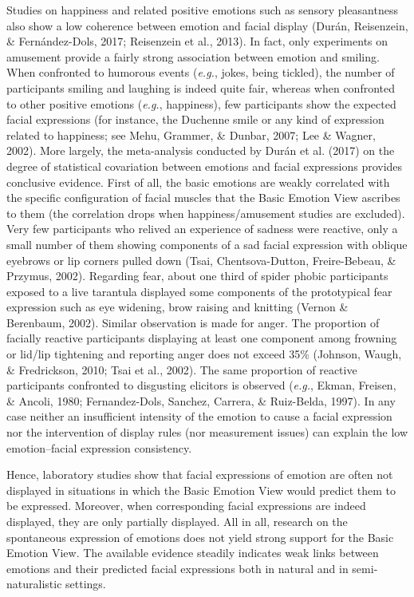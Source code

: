 \documentclass[
  english,
  doc]{apa7}
\begin{document}
Studies on happiness and related positive emotions such as sensory pleasantness also show a low coherence between emotion and facial display (Durán, Reisenzein, \& Fernández-Dols, 2017; Reisenzein et al., 2013). In fact, only experiments on amusement provide a fairly strong association between emotion and smiling. When confronted to humorous events (\emph{e.g.}, jokes, being tickled), the number of participants smiling and laughing is indeed quite fair, whereas when confronted to other positive emotions (\emph{e.g.}, happiness), few participants show the expected facial expressions (for instance, the Duchenne smile or any kind of expression related to happiness; see Mehu, Grammer, \& Dunbar, 2007; Lee \& Wagner, 2002). More largely, the meta-analysis conducted by Durán et al. (2017) on the degree of statistical covariation between emotions and facial expressions provides conclusive evidence. First of all, the basic emotions are weakly correlated with the specific configuration of facial muscles that the Basic Emotion View ascribes to them (the correlation drops when happiness/amusement studies are excluded). Very few participants who relived an experience of sadness were reactive, only a small number of them showing components of a sad facial expression with oblique eyebrows or lip corners pulled down (Tsai, Chentsova-Dutton, Freire-Bebeau, \& Przymus, 2002). Regarding fear, about one third of spider phobic participants exposed to a live tarantula displayed some components of the prototypical fear expression such as eye widening, brow raising and knitting (Vernon \& Berenbaum, 2002). Similar observation is made for anger. The proportion of facially reactive participants displaying at least one component among frowning or lid/lip tightening and reporting anger does not exceed 35\% (Johnson, Waugh, \& Fredrickson, 2010; Tsai et al., 2002). The same proportion of reactive participants confronted to disgusting elicitors is observed (\emph{e.g.}, Ekman, Freisen, \& Ancoli, 1980; Fernandez-Dols, Sanchez, Carrera, \& Ruiz-Belda, 1997). In any case neither an insufficient intensity of the emotion to cause a facial expression nor the intervention of display rules (nor measurement issues) can explain the low emotion--facial expression consistency.

Hence, laboratory studies show that facial expressions of emotion are often not displayed in situations in which the Basic Emotion View would predict them to be expressed. Moreover, when corresponding facial expressions are indeed displayed, they are only partially displayed. All in all, research on the spontaneous expression of emotions does not yield strong support for the Basic Emotion View. The available evidence steadily indicates weak links between emotions and their predicted facial expressions both in natural and in semi-naturalistic settings.
\end{document}
